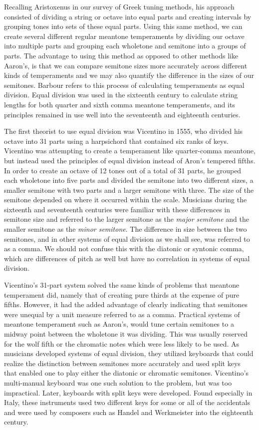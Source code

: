 Recalling Aristoxenus in our survey of Greek tuning methods, his approach consisted of
dividing a string or octave into equal parts and creating intervals by grouping tones into
sets of these equal parts. Using this same method, we can create several different regular
meantone temperaments by dividing our octave into multiple parts and grouping each
wholetone and semitone into a groups of parts. The advantage to using this method as
opposed to other methods like Aaron's, is that we can compare semitone sizes more
accurately across different kinds of temperaments and we may also quantify the difference
in the sizes of our semitones. Barbour refers to this process of calculating temperaments
as equal division. Equal division was used in the sixteenth century to calculate string
lengths for both quarter and sixth comma meantone temperaments, and its principles
remained in use well into the seventeenth and eighteenth centuries.

The first theorist to use equal division was Vicentino in 1555, who divided his octave
into 31 parts using a harpsichord that contained six ranks of keys. Vicentino was
attempting to create a temperament like quarter-comma meantone, but instead used the
principles of equal division instead of Aron's tempered fifths. In order to create an
octave of 12 tones out of a total of 31 parts, he grouped each wholetone into five parts
and divided the semitone into two different sizes, a smaller semitone with two parts and a
larger semitone with three.  The size of the semitone depended on where it occurred within
the scale. Musicians during the sixteenth and seventeenth centuries were familiar with
these differences in semitone size and referred to the larger semitone as the
\textit{major semitone} and the smaller semitone as the \textit{minor semitone}.  The
difference in size between the two semitones, and in other systems of equal division as we
shall see, was referred to as a comma.  We should not confuse this with the diatonic or
syntonic comma, which are differences of pitch as well but have no correlation in systems
of equal division.

Vicentino's 31-part system solved the same kinds of problems that meantone temperament
did, namely that of creating pure thirds at the expense of pure fifths. However, it had
the added advantage of clearly indicating that semitones were unequal by a unit measure
referred to as a comma.  Practical systems of meantone temperament such as Aaron's, would
tune certain semitones to a midway point between the wholetone it was dividing.  This was
usually reserved for the wolf fifth or the chromatic notes which were less likely to be
used.  As musicians developed systems of equal division, they utilized keyboards that
could realize the distinction between semitones more accurately and used split keys that
enabled one to play either the diatonic or chromatic semitones.  Vicentino's multi-manual
keyboard was one such solution to the problem, but was too impractical.  Later, keyboards
with split keys were developed.  Found especially in Italy, these instruments used two
different keys for some or all of the accidentals and were used by composers such as
Handel and Werkmeister into the eighteenth century. \autocite[108]{MB:1}

